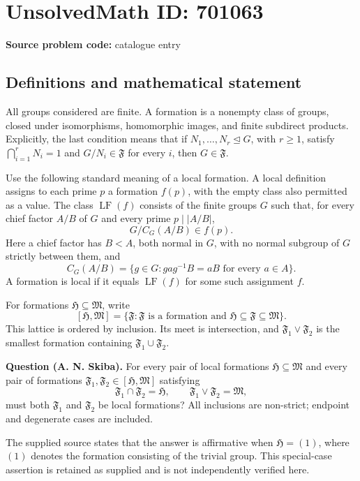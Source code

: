 \documentclass[11pt]{article}
\begin{document}
\section*{UnsolvedMath ID: 701063}
\textbf{Source problem code:} catalogue entry
\subsection{Definitions and mathematical statement}
All groups considered are finite. A formation is a nonempty class of groups, closed under isomorphisms, homomorphic images, and finite subdirect products. Explicitly, the last condition means that if \(N_1,\ldots,N_r\trianglelefteq G\), with \(r\geq 1\), satisfy \(\bigcap_{i=1}^r N_i=1\) and \(G/N_i\in\mathfrak F\) for every \(i\), then \(G\in\mathfrak F\).

Use the following standard meaning of a local formation. A local definition assigns to each prime \(p\) a formation \(f(p)\), with the empty class also permitted as a value. The class \(\operatorname{LF}(f)\) consists of the finite groups \(G\) such that, for every chief factor \(A/B\) of \(G\) and every prime \(p\mid |A/B|\),
\[
G/C_G(A/B)\in f(p).
\]
Here a chief factor has \(B<A\), both normal in \(G\), with no normal subgroup of \(G\) strictly between them, and
\[
C_G(A/B)=\{g\in G: gag^{-1}B=aB\text{ for every }a\in A\}.
\]
A formation is local if it equals \(\operatorname{LF}(f)\) for some such assignment \(f\).

For formations \(\mathfrak H\subseteq\mathfrak M\), write
\[
[\mathfrak H,\mathfrak M]
=\{\mathfrak F:\mathfrak F\text{ is a formation and }\mathfrak H\subseteq\mathfrak F\subseteq\mathfrak M\}.
\]
This lattice is ordered by inclusion. Its meet is intersection, and \(\mathfrak F_1\vee\mathfrak F_2\) is the smallest formation containing \(\mathfrak F_1\cup\mathfrak F_2\).

\textbf{Question (A. N. Skiba).} For every pair of local formations \(\mathfrak H\subseteq\mathfrak M\) and every pair of formations \(\mathfrak F_1,\mathfrak F_2\in[\mathfrak H,\mathfrak M]\) satisfying
\[
\mathfrak F_1\cap\mathfrak F_2=\mathfrak H,
\qquad
\mathfrak F_1\vee\mathfrak F_2=\mathfrak M,
\]
must both \(\mathfrak F_1\) and \(\mathfrak F_2\) be local formations? All inclusions are non-strict; endpoint and degenerate cases are included.

The supplied source states that the answer is affirmative when \(\mathfrak H=(1)\), where \((1)\) denotes the formation consisting of the trivial group. This special-case assertion is retained as supplied and is not independently verified here.
\end{document}
